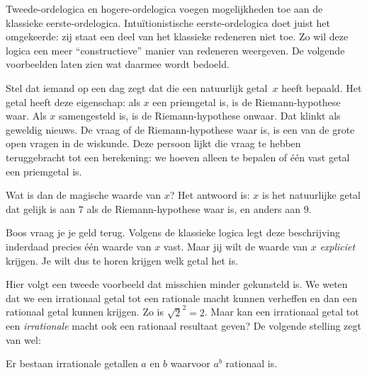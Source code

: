 \documentclass[openany]{memoir}
\begin{document}
\begingroup
\def\olfilename{OLP-0179}
\def\olfilepath{content/first-order-logic/beyond/}
\hypertarget{unit-OLP-0179}{}





Tweede-ordelogica en hogere-ordelogica voegen mogelijkheden toe aan de klassieke
eerste-ordelogica. Intuïtionistische eerste-ordelogica doet juist het omgekeerde:
zij staat een deel van het klassieke redeneren niet toe. Zo wil deze logica een
meer ``constructieve'' manier van redeneren weergeven. De volgende voorbeelden
laten zien wat daarmee wordt bedoeld.

Stel dat iemand op een dag zegt dat die een natuurlijk getal~$x$ heeft bepaald.
Het getal heeft deze eigenschap: als $x$ een priemgetal is, is de
Riemann-hypothese waar. Als $x$ samengesteld is, is de Riemann-hypothese onwaar.
Dat klinkt als geweldig nieuws. De vraag of de Riemann-hypothese waar is, is een
van de grote open vragen in de wiskunde. Deze persoon lijkt die vraag te hebben
teruggebracht tot een berekening: we hoeven alleen te bepalen of één vast getal
een priemgetal is.

Wat is dan de magische waarde van $x$? Het antwoord is: $x$ is het natuurlijke
getal dat gelijk is aan $7$ als de Riemann-hypothese waar is, en anders aan $9$.

Boos vraag je je geld terug. Volgens de klassieke logica legt deze beschrijving
inderdaad precies één waarde van $x$ vast. Maar jij wilt de waarde van $x$
\emph{expliciet} krijgen. Je wilt dus te horen krijgen welk getal het is.

Hier volgt een tweede voorbeeld dat misschien minder gekunsteld is. We weten dat
we een irrationaal getal tot een rationale macht kunnen verheffen en dan een
rationaal getal kunnen krijgen. Zo is $\sqrt{2}^2 = 2$. Maar kan een irrationaal
getal tot een \emph{irrationale} macht ook een rationaal resultaat geven? De
volgende stelling zegt van wel:

\begin{thm}
Er bestaan irrationale getallen $a$ en $b$ waarvoor $a^b$ rationaal is.
\end{thm}
\end{document}
